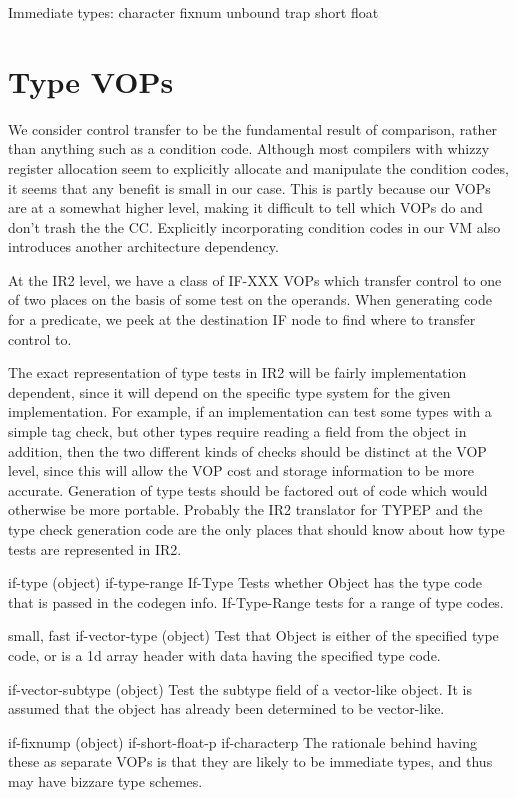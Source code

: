 Immediate types:
  character
  fixnum
  unbound trap
  short float


\section{Type VOPs}

We consider control transfer to be the fundamental result of comparison, rather
than anything such as a condition code.  Although most compilers with whizzy
register allocation seem to explicitly allocate and manipulate the condition
codes, it seems that any benefit is small in our case.  This is partly because
our VOPs are at a somewhat higher level, making it difficult to tell which VOPs
do and don't trash the the CC.  Explicitly incorporating condition codes in our
VM also introduces another architecture dependency.

At the IR2 level, we have a class of IF-XXX VOPs which transfer control to one
of two places on the basis of some test on the operands.  When generating code
for a predicate, we peek at the destination IF node to find where to transfer
control to.
			
The exact representation of type tests in IR2 will be fairly implementation
dependent, since it will depend on the specific type system for the given
implementation.  For example, if an implementation can test some types with a
simple tag check, but other types require reading a field from the object in
addition, then the two different kinds of checks should be distinct at the VOP
level, since this will allow the VOP cost and storage information to be more
accurate.  Generation of type tests should be factored out of code which would
otherwise be more portable.  Probably the IR2 translator for TYPEP and the type
check generation code are the only places that should know about how type tests
are represented in IR2.

if-type (object)
if-type-range
    If-Type Tests whether Object has the type code that is passed in the
    codegen info.  If-Type-Range tests for a range of type codes.

{small, fast} if-vector-type (object)
    Test that Object is either of the specified type code, or is a 1d array
    header with data having the specified type code.

if-vector-subtype (object)
    Test the subtype field of a vector-like object.  It is assumed that the
    object has already been determined to be vector-like.

if-fixnump (object)
if-short-float-p
if-characterp
    The rationale behind having these as separate VOPs is that they are likely
    to be immediate types, and thus may have bizzare type schemes.

